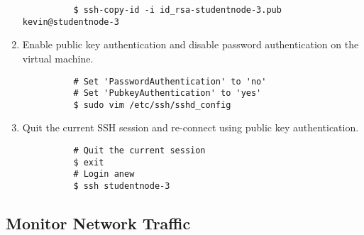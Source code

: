 \begin{enumerate}
        \begin{verbatim}
          $ ssh-copy-id -i id_rsa-studentnode-3.pub kevin@studentnode-3
        \end{verbatim}

  \item Enable public key authentication and disable password authentication on the virtual machine.

        \begin{verbatim}
          # Set 'PasswordAuthentication' to 'no'
          # Set 'PubkeyAuthentication' to 'yes'
          $ sudo vim /etc/ssh/sshd_config
        \end{verbatim}

  \item Quit the current SSH session and re-connect using public key authentication.

        \begin{verbatim}
          # Quit the current session
          $ exit
          # Login anew
          $ ssh studentnode-3
        \end{verbatim}
\end{enumerate}

\subsection{Monitor Network Traffic}

